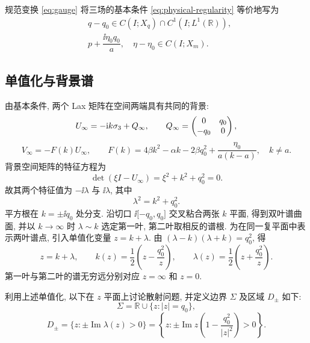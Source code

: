 \begin{remark}\label{rem:gauged-regularity}
规范变换 \eqref{eq:gauge} 将三场的基本条件 \eqref{eq:physical-regularity} 等价地写为
\begin{equation}\label{eq:evolution-regularity}
\begin{aligned}
&q-q_0\in C(I;X_q)\cap C^1(I;L^1(\mathbb R)),\\
&p+\dfrac{\ii\eta_0q_0}{a},\quad\eta-\eta_0\in C(I;X_m).
\end{aligned}
\end{equation}
\end{remark}

\subsection{单值化与背景谱}
由基本条件, 两个 Lax 矩阵在空间两端具有共同的背景:
\begin{equation}\label{eq:background-spatial}
U_\infty=-\mathrm{i} k\sigma_3+Q_\infty,\qquad
Q_\infty=\begin{pmatrix}0&q_0\\-q_0&0\end{pmatrix},
\end{equation}
\begin{equation}\label{eq:F}
V_\infty=-F(k)U_\infty,\qquad
F(k)=4\beta k^2-\alpha k-2\beta q_0^2+\dfrac{\eta_0}{a(k-a)},\quad k\ne a.
\end{equation}
背景空间矩阵的特征方程为
\begin{equation*}
\det(\xi I-U_\infty)=\xi^2+k^2+q_0^2=0.
\end{equation*}
故其两个特征值为 $-\ii\lambda$ 与 $\ii\lambda$, 其中
\begin{equation}\label{eq:spectral-curve}
\lambda^2=k^2+q_0^2.
\end{equation}
平方根在 $k=\pm\ii q_0$ 处分支. 沿切口 $\ii\lbrack-q_0,q_0\rbrack$ 交叉粘合两张 $k$ 平面,
得到双叶谱曲面\cite{ZhangFan2020}, 并以 $k\to\infty$ 时 $\lambda\sim k$ 选定第一叶, 第二叶取相反的谱根.
为在同一复平面中表示两叶谱点, 引入单值化变量 $z=k+\lambda$.
由 $(\lambda-k)(\lambda+k)=q_0^2$, 得
\begin{equation}\label{eq:uniform}
z=k+\lambda,\qquad
k(z)=\dfrac{1}{2}\left(z-\dfrac{q_0^2}{z}\right),\qquad
\lambda(z)=\dfrac{1}{2}\left(z+\dfrac{q_0^2}{z}\right).
\end{equation}
第一叶与第二叶的谱无穷远分别对应 $z=\infty$ 和 $z=0$.

\label{prop:curve}\label{prop:domains}
利用上述单值化, 以下在 $z$ 平面上讨论散射问题, 并定义边界 $\Sigma$ 及区域 $D_\pm$ 如下:
\begin{equation}\label{eq:Sigma}
\Sigma=\mathbb R\cup\{z:|z|=q_0\},
\end{equation}
\begin{equation}\label{eq:domains}
D_\pm=\{z:\pm\operatorname{Im}\lambda(z)>0\}
=\left\{z:\pm\operatorname{Im}z\left(1-\dfrac{q_0^2}{|z|^2}\right)>0\right\}.
\end{equation}

